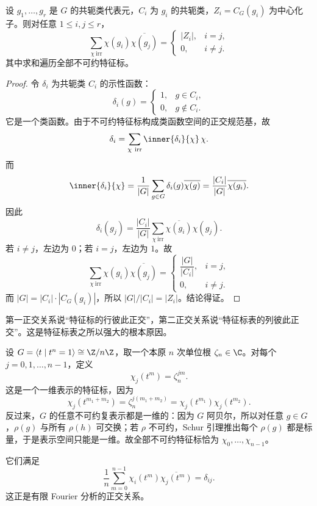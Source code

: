 \begin{theorem}[第二正交关系]
设 $g_1,\dots,g_r$ 是 $G$ 的共轭类代表元，$C_i$ 为 $g_i$ 的共轭类，$Z_i=C_G(g_i)$ 为中心化子。则对任意 $1\le i,j\le r$，
\[
\sum_{\chi\ \mathrm{irr}} \chi(g_i)\overline{\chi(g_j)}=
\begin{cases}
|Z_i|,& i=j,\\
0,& i\neq j.
\end{cases}
\]
其中求和遍历全部不可约特征标。
\end{theorem}

\begin{proof}
令 $\delta_i$ 为共轭类 $C_i$ 的示性函数：
\[
\delta_i(g)=
\begin{cases}
1,& g\in C_i,\\
0,& g\notin C_i.
\end{cases}
\]
它是一个类函数。由于不可约特征标构成类函数空间的正交规范基，故
\[
\delta_i=\sum_{\chi\ \mathrm{irr}} \inner{\delta_i}{\chi}\,\chi.
\]
而
\[
\inner{\delta_i}{\chi}
=\frac{1}{|G|}\sum_{g\in G}\delta_i(g)\overline{\chi(g)}
=\frac{|C_i|}{|G|}\overline{\chi(g_i)}.
\]
因此
\[
\delta_i(g_j)=\frac{|C_i|}{|G|}\sum_{\chi\ \mathrm{irr}}\overline{\chi(g_i)}\chi(g_j).
\]
若 $i\neq j$，左边为 $0$；若 $i=j$，左边为 $1$。故
\[
\sum_{\chi\ \mathrm{irr}}\chi(g_i)\overline{\chi(g_j)}=
\begin{cases}
\dfrac{|G|}{|C_i|},& i=j,\\
0,& i\neq j.
\end{cases}
\]
而 $|G|=|C_i|\cdot |C_G(g_i)|$，所以 $|G|/|C_i|=|Z_i|$。结论得证。
\end{proof}

\begin{remark}
第一正交关系说“特征标的行彼此正交”，第二正交关系说“特征标表的列彼此正交”。这是特征标表之所以强大的根本原因。
\end{remark}

\begin{example}
设 $G=\langle t\mid t^n=1\rangle\cong \Z/n\Z$，取一个本原 $n$ 次单位根 $\zeta_n\in \C$。对每个 $j=0,1,\dots,n-1$，定义
\[
\chi_j(t^m)=\zeta_n^{jm}.
\]
这是一个一维表示的特征标，因为
\[
\chi_j(t^{m_1+m_2})=\zeta_n^{j(m_1+m_2)}=
\chi_j(t^{m_1})\chi_j(t^{m_2}).
\]
反过来，$G$ 的任意不可约复表示都是一维的：因为 $G$ 阿贝尔，所以对任意 $g\in G$，$\rho(g)$ 与所有 $\rho(h)$ 可交换；若 $\rho$ 不可约，Schur 引理推出每个 $\rho(g)$ 都是标量，于是表示空间只能是一维。故全部不可约特征标恰为 $\chi_0,\dots,\chi_{n-1}$。

它们满足
\[
\frac{1}{n}\sum_{m=0}^{n-1}\chi_i(t^m)\overline{\chi_j(t^m)}=\delta_{ij}.
\]
这正是有限 Fourier 分析的正交关系。
\end{example}

